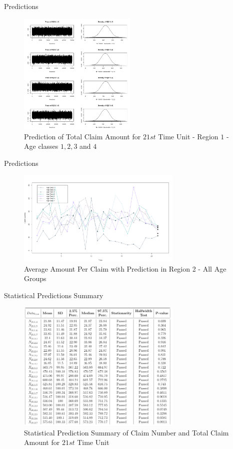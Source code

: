 \documentclass[10pt]{beamer} %
\begin{document}
\begin{frame}{Predictions}
   \begin{figure}[H]
    \centering
    \includegraphics[width=0.5\textwidth ]{X_21_1.png}
    \caption{Prediction of Total Claim Amount for $21st$ Time Unit - Region $1$ - Age classes $1,2, 3$ and $4$}
    \label{predictionX1}
\end{figure} 
\end{frame}

\begin{frame}{Predictions}
   \begin{figure}[H]
    \centering
    \includegraphics[width=0.7\textwidth ]{Average_claim_amount_REGION1.png}
    \caption{Average Amount Per Claim with Prediction in Region 2 - All Age Groups  }
    \label{predictionX_average_region2}
\end{figure} 
\end{frame}
\begin{frame}{Statistical Predictions Summary}
    \begin{figure}
        \centering
        \includegraphics[width=0.7\textwidth]{summary2.png}
        \caption{Statistical Prediction Summary of Claim Number and Total Claim Amount for $21st$ Time Unit}
        \label{fig:my_label}
    \end{figure}
\end{frame}
\end{document}
